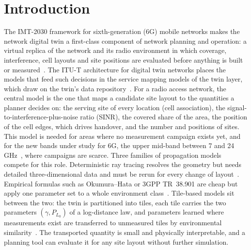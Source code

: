 \section{Introduction}
\label{sec:intro}

The IMT-2030 framework for sixth-generation (6G) mobile networks makes the
network digital twin a first-class component of network planning and
operation: a virtual replica of the network and its radio environment in
which coverage, interference, cell layouts and site positions are evaluated
before anything is built or measured~\cite{itu2160,khan2022dt,alkhateeb2023dt}.
The ITU-T architecture for digital twin networks places the models that feed
such decisions in the service mapping models of the twin layer, which
draw on the twin's data repository~\cite{ituy3090}. For a
radio access network, the central model is the one that maps a candidate
site layout to the quantities a planner decides on: the serving site of
every location (cell association), the signal-to-interference-plus-noise
ratio (SINR), the covered share of the area, the position of the cell edges,
which drives handover, and the number and positions of sites. This model is
needed for areas where no measurement campaign exists yet, and for the new
bands under study for 6G, the upper mid-band between 7 and
24\,GHz~\cite{tr38820}, where campaigns are scarce. Three families of
propagation models compete for this role. Deterministic ray tracing
resolves the geometry but needs detailed three-dimensional data and must be
rerun for every change of layout~\cite{yun2015raytracing,hoydis2023sionna}.
Empirical formulas such as Okumura--Hata or 3GPP TR~38.901 are cheap but
apply one parameter set to a whole environment
class~\cite{hata1980,tr38901}. Tile-based models sit between the two: the
twin is partitioned into tiles, each tile carries the two parameters
$(\gamma,P_{L_0})$ of a log-distance law, and parameters learned where
measurements exist are transferred to unmeasured tiles by environmental
similarity~\cite{ozyurt2020maple,ozyurt2026}. The transported quantity is
small and physically interpretable, and a planning tool can evaluate it for
any site layout without further simulation.

